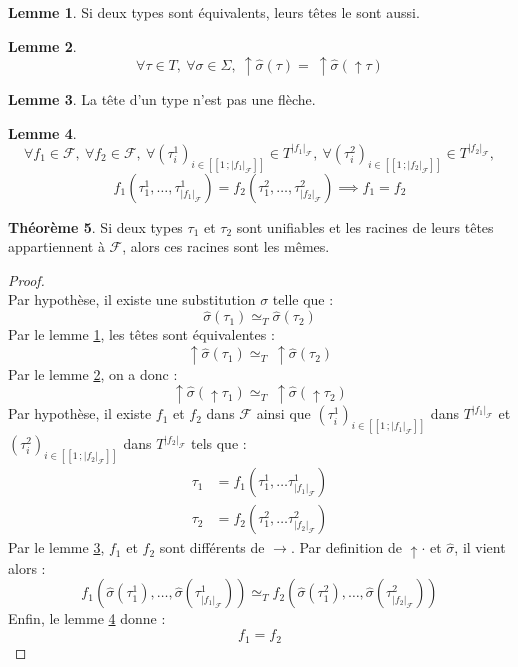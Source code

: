 \documentclass[a4paper]{report}
\newenvironment{preuve} 
	{\begin{proof}~\\} 
	{\end{proof}}
\theoremstyle{definition}
\newtheorem{theoreme}{Théorème}
\newtheorem{lemme}[theoreme]{Lemme}
\newcommand{\interval}[2]{[\![#1\,;#2]\!]}
\newcommand{\F}{\mathscr F}
\newcommand{\Tequiv}{\simeq_T}
\begin{document}
\begin{lemme} \label{equiv_tete}
	Si deux types sont équivalents, leurs têtes le sont aussi.
\end{lemme}

\begin{lemme} \label{tete_subst_tete}
	\[ \forall \tau \in T,\ \forall \sigma \in \Sigma,\ \uparrow \hat \sigma (\tau) =\ \uparrow \hat \sigma (\uparrow \tau) \]
\end{lemme}

\begin{lemme} \label{tete_non_fleche}
	La tête d'un type n'est pas une flèche.
\end{lemme}

\begin{lemme} \label{cons_equiv}
	\[
		\forall f_1 \in \F ,\ 
		\forall f_2 \in \F,\ 
		\forall (\tau^1_i)_{i \in \interval 1 {|f_1|_\F}} \in T^{|f_1|_\F},\ 
		\forall (\tau^2_i)_{i \in \interval 1 {|f_2|_\F}} \in T^{|f_2|_\F},
	\]\[
		f_1 (\tau^1_1, \dots, \tau^1_{|f_1|_\F}) =
		f_2 (\tau^2_1, \dots, \tau^2_{|f_2|_\F})
		\implies f_1 = f_2
	\]
\end{lemme}

\begin{theoreme}
	Si deux types $\tau_1$ et $\tau_2$ sont unifiables et les racines de leurs têtes appartiennent à $\F$, alors ces racines sont les mêmes.
\end{theoreme}

\begin{preuve}
	Par hypothèse, il existe une substitution $\sigma$ telle que :
	\[ \hat \sigma (\tau_1) \Tequiv \hat \sigma (\tau_2) \]
	Par le lemme \ref{equiv_tete}, les têtes sont équivalentes :
	\[ \uparrow \hat \sigma (\tau_1) \Tequiv\ \uparrow \hat \sigma (\tau_2) \]
	Par le lemme \ref{tete_subst_tete}, on a donc :
	\[ \uparrow \hat \sigma (\uparrow \tau_1) \Tequiv\ \uparrow \hat \sigma (\uparrow \tau_2) \]
	Par hypothèse, il existe $f_1$ et $f_2$ dans $\F$ ainsi que $(\tau^1_i)_{i \in \interval 1 {|f_1|_\F}}$ dans $T^{|f_1|_\F}$ et $(\tau^2_i)_{i \in \interval 1 {|f_2|_\F}}$ dans $T^{|f_2|_\F}$ tels que :
	\begin{align*}
			\tau_1 &= f_1 (\tau^1_1, \dots \tau^1_{|f_1|_\F})
		\\
			\tau_2 &= f_2 (\tau^2_1, \dots \tau^2_{|f_2|_\F})
	\end{align*}
	Par le lemme \ref{tete_non_fleche}, $f_1$ et $f_2$ sont différents de $\rightarrow$. Par definition de $\uparrow \cdot$ et $\hat \sigma$, il vient alors :
	\[ f_1 (\hat \sigma (\tau^1_1), \dots, \hat \sigma (\tau^1_{|f_1|_\F})) \Tequiv f_2 (\hat \sigma (\tau^2_1), \dots, \hat \sigma (\tau^2_{|f_2|_\F})) \]
	Enfin, le lemme \ref{cons_equiv} donne :
	\[ f_1 = f_2 \]
\end{preuve}
\end{document}
